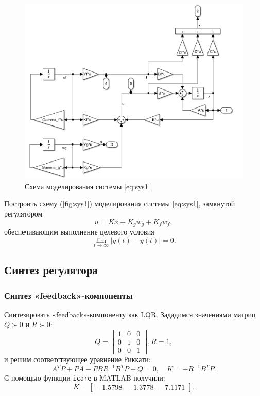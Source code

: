 \begin{figure}[H]
    \centering
    \includegraphics[width=\linewidth]{figs/10slx.png}
    \caption{Схема моделирования системы \eqref{eq:sys1}}
    \label{fig:sys1}
\end{figure}
Построить схему (\autoref{fig:sys1}) моделирования системы \eqref{eq:sys1}, 
замкнутой регулятором
\begin{equation}
    \label{eq:reg1}
    u=Kx+K_gw_g+K_fw_f,
\end{equation}
обеспечивающим выполнение целевого условия
\begin{equation}
    \label{eq:goal1}
    \lim_{t\rightarrow\infty}|g(t)-y(t)|=0.
\end{equation}

\subsection{Синтез регулятора}

\subsubsection{Синтез «feedback»-компоненты}

Синтезировать «feedback»-компоненту как LQR.
Зададимся значениями матриц $Q\succ0$ и $R\succ0$:
\begin{equation*}
    Q=\begin{bmatrix}
        1 & 0 & 0\\
        0 & 1 & 0\\
        0 & 0 & 1
    \end{bmatrix},
    R=1,
\end{equation*}
и решим соответствующее уравнение Риккати:
\begin{equation}
    \label{eq:ric1}
    A^TP+PA-PBR^{-1}B^TP+Q=0,\quad K=-R^{-1}B^TP.
\end{equation}
С помощью функции \texttt{icare} в MATLAB получили:
\begin{equation}
    \label{eq:K}
    K =\begin{bmatrix}
        -1.5798&	-1.3778	&-7.1171
    \end{bmatrix}.
\end{equation}

